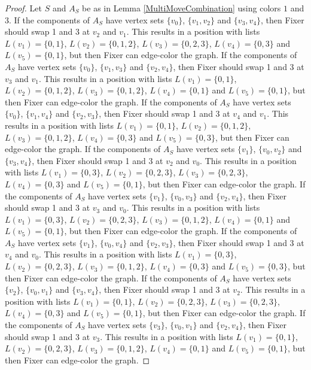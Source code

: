 \documentclass[12pt]{amsart}
\theoremstyle{plain}
\theoremstyle{definition}
\theoremstyle{remark}
\begin{document}
\begin{proof}
Let $S$ and $A_S$ be as in Lemma \ref{MultiMoveCombination} using colors $1$ and $3$. If the components of $A_S$ have vertex sets $\{v_0\}$, $\{v_1, v_2\}$ and $\{v_3, v_4\}$, then Fixer should swap 1 and 3 at $v_2$ and $v_1$. This results in a position with lists $L(v_1) = \{0, 1\}$, $L(v_2) = \{0, 1, 2\}$, $L(v_3) = \{0, 2, 3\}$, $L(v_4) = \{0, 3\}$ and $L(v_5) = \{0, 1\}$, but then Fixer can edge-color the graph.
If the components of $A_S$ have vertex sets $\{v_0\}$, $\{v_1, v_3\}$ and $\{v_2, v_4\}$, then Fixer should swap 1 and 3 at $v_3$ and $v_1$. This results in a position with lists $L(v_1) = \{0, 1\}$, $L(v_2) = \{0, 1, 2\}$, $L(v_3) = \{0, 1, 2\}$, $L(v_4) = \{0, 1\}$ and $L(v_5) = \{0, 1\}$, but then Fixer can edge-color the graph.
If the components of $A_S$ have vertex sets $\{v_0\}$, $\{v_1, v_4\}$ and $\{v_2, v_3\}$, then Fixer should swap 1 and 3 at $v_4$ and $v_1$. This results in a position with lists $L(v_1) = \{0, 1\}$, $L(v_2) = \{0, 1, 2\}$, $L(v_3) = \{0, 1, 2\}$, $L(v_4) = \{0, 3\}$ and $L(v_5) = \{0, 3\}$, but then Fixer can edge-color the graph.
If the components of $A_S$ have vertex sets $\{v_1\}$, $\{v_0, v_2\}$ and $\{v_3, v_4\}$, then Fixer should swap 1 and 3 at $v_2$ and $v_0$. This results in a position with lists $L(v_1) = \{0, 3\}$, $L(v_2) = \{0, 2, 3\}$, $L(v_3) = \{0, 2, 3\}$, $L(v_4) = \{0, 3\}$ and $L(v_5) = \{0, 1\}$, but then Fixer can edge-color the graph.
If the components of $A_S$ have vertex sets $\{v_1\}$, $\{v_0, v_3\}$ and $\{v_2, v_4\}$, then Fixer should swap 1 and 3 at $v_3$ and $v_0$. This results in a position with lists $L(v_1) = \{0, 3\}$, $L(v_2) = \{0, 2, 3\}$, $L(v_3) = \{0, 1, 2\}$, $L(v_4) = \{0, 1\}$ and $L(v_5) = \{0, 1\}$, but then Fixer can edge-color the graph.
If the components of $A_S$ have vertex sets $\{v_1\}$, $\{v_0, v_4\}$ and $\{v_2, v_3\}$, then Fixer should swap 1 and 3 at $v_4$ and $v_0$. This results in a position with lists $L(v_1) = \{0, 3\}$, $L(v_2) = \{0, 2, 3\}$, $L(v_3) = \{0, 1, 2\}$, $L(v_4) = \{0, 3\}$ and $L(v_5) = \{0, 3\}$, but then Fixer can edge-color the graph.
If the components of $A_S$ have vertex sets $\{v_2\}$, $\{v_0, v_1\}$ and $\{v_3, v_4\}$, then Fixer should swap 1 and 3 at $v_2$. This results in a position with lists $L(v_1) = \{0, 1\}$, $L(v_2) = \{0, 2, 3\}$, $L(v_3) = \{0, 2, 3\}$, $L(v_4) = \{0, 3\}$ and $L(v_5) = \{0, 1\}$, but then Fixer can edge-color the graph.
If the components of $A_S$ have vertex sets $\{v_3\}$, $\{v_0, v_1\}$ and $\{v_2, v_4\}$, then Fixer should swap 1 and 3 at $v_3$. This results in a position with lists $L(v_1) = \{0, 1\}$, $L(v_2) = \{0, 2, 3\}$, $L(v_3) = \{0, 1, 2\}$, $L(v_4) = \{0, 1\}$ and $L(v_5) = \{0, 1\}$, but then Fixer can edge-color the graph.

\end{proof}
\end{document}
